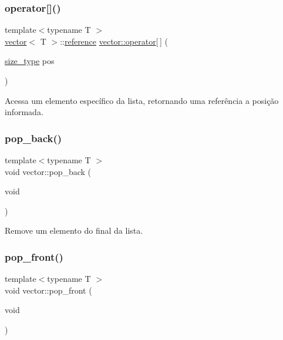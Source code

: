 \subsubsection{\texorpdfstring{operator[]()}{operator[]()}\hspace{0.1cm}{\footnotesize\ttfamily [2/2]}}
{\footnotesize\ttfamily template$<$typename T $>$ \\
\hyperlink{classsc_1_1vector}{vector}$<$ T $>$\+::\hyperlink{classsc_1_1vector_a37394c8a6b82c4a0709737d7982e32b2}{reference} \hyperlink{classsc_1_1vector_a889e37c4415a33fb90d8b564bf428e24}{vector\+::operator}\mbox{[}$\,$\mbox{]} (\begin{DoxyParamCaption}\item[{\hyperlink{classsc_1_1vector_a48bf37ba1a6d0c13504414d86e27c399}{size\+\_\+type}}]{pos }\end{DoxyParamCaption})}



Acessa um elemento específico da lista, retornando uma referência a posição informada. 

\mbox{\label{classsc_1_1vector_a14f1f81fdf7c217436a711fc146dd468}} 
\subsubsection{\texorpdfstring{pop\+\_\+back()}{pop\_back()}}
{\footnotesize\ttfamily template$<$typename T $>$ \\
void vector\+::pop\+\_\+back (\begin{DoxyParamCaption}\item[{void}]{ }\end{DoxyParamCaption})}



Remove um elemento do final da lista. 

\mbox{\label{classsc_1_1vector_a70a3d59cfa4558d7efbb42f8a8e772d7}} 
\subsubsection{\texorpdfstring{pop\+\_\+front()}{pop\_front()}}
{\footnotesize\ttfamily template$<$typename T $>$ \\
void vector\+::pop\+\_\+front (\begin{DoxyParamCaption}\item[{void}]{ }\end{DoxyParamCaption})}



